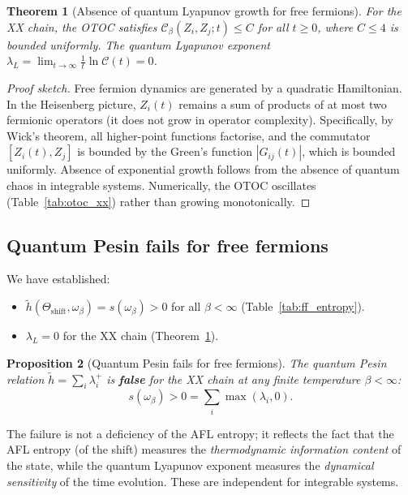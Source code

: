 \documentclass[12pt,a4paper]{article}
\newtheorem{theorem}{Theorem}[section]
\newtheorem{proposition}[theorem]{Proposition}
\begin{document}
\begin{theorem}[Absence of quantum Lyapunov growth for free fermions]
\label{thm:ff_no_lyapunov}
  For the XX chain, the OTOC satisfies
  $\mathcal{C}_\beta(Z_i, Z_j; t) \leq C$ for all $t \geq 0$, where
  $C \leq 4$ is bounded uniformly.  The quantum Lyapunov exponent
  $\lambda_L = \lim_{t \to \infty} \frac{1}{t} \ln \mathcal{C}(t) = 0$.
\end{theorem}
\begin{proof}[Proof sketch]
  Free fermion dynamics are generated by a quadratic Hamiltonian.  In the Heisenberg
  picture, $Z_i(t)$ remains a sum of products of at most two fermionic operators (it
  does not grow in operator complexity).  Specifically, by Wick's theorem, all
  higher-point functions factorise, and the commutator $[Z_i(t), Z_j]$ is bounded by
  the Green's function $|G_{ij}(t)|$, which is bounded uniformly.  Absence of
  exponential growth follows from the absence of quantum chaos in integrable systems.
  Numerically, the OTOC oscillates (Table~\ref{tab:otoc_xx}) rather than growing
  monotonically.
\end{proof}

\subsection{Quantum Pesin fails for free fermions}

We have established:
\begin{itemize}
  \item $\widetilde{h}(\Theta_{\mathrm{shift}}, \omega_\beta) = s(\omega_\beta) > 0$ for
        all $\beta < \infty$ (Table~\ref{tab:ff_entropy}).
  \item $\lambda_L = 0$ for the XX chain (Theorem~\ref{thm:ff_no_lyapunov}).
\end{itemize}

\begin{proposition}[Quantum Pesin fails for free fermions]
  \label{prop:qp_fails}
  The quantum Pesin relation $\widetilde{h} = \sum_i \lambda_i^+$ is \textbf{false} for
  the XX chain at any finite temperature $\beta < \infty$:
  \[
    s(\omega_\beta) > 0 = \sum_i \max(\lambda_i, 0).
  \]
\end{proposition}

The failure is not a deficiency of the AFL entropy; it reflects the fact that the AFL
entropy (of the shift) measures the \emph{thermodynamic information content} of the
state, while the quantum Lyapunov exponent measures the \emph{dynamical sensitivity}
of the time evolution.  These are independent for integrable systems.
\end{document}
